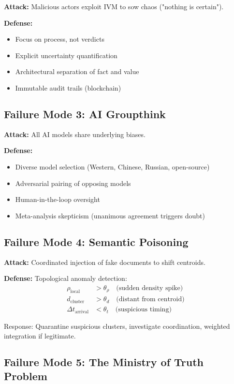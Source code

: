 \documentclass[11pt,a4paper]{article}
\theoremstyle{definition}
\theoremstyle{remark}
\begin{document}
\textbf{Attack:} Malicious actors exploit IVM to sow chaos ("nothing is certain").

\textbf{Defense:}
\begin{itemize}
\item Focus on process, not verdicts
\item Explicit uncertainty quantification
\item Architectural separation of fact and value
\item Immutable audit trails (blockchain)
\end{itemize}

\subsection{Failure Mode 3: AI Groupthink}

\textbf{Attack:} All AI models share underlying biases.

\textbf{Defense:}
\begin{itemize}
\item Diverse model selection (Western, Chinese, Russian, open-source)
\item Adversarial pairing of opposing models
\item Human-in-the-loop oversight
\item Meta-analysis skepticism (unanimous agreement triggers doubt)
\end{itemize}

\subsection{Failure Mode 4: Semantic Poisoning}

\textbf{Attack:} Coordinated injection of fake documents to shift centroids.

\textbf{Defense:} Topological anomaly detection:
\begin{align}
\rho_{\text{local}} &> \theta_{\rho} \quad \text{(sudden density spike)}\\
d_{\text{cluster}} &> \theta_d \quad \text{(distant from centroid)}\\
\Delta t_{\text{arrival}} &< \theta_t \quad \text{(suspicious timing)}
\end{align}

Response: Quarantine suspicious clusters, investigate coordination, weighted integration if legitimate.

\subsection{Failure Mode 5: The Ministry of Truth Problem}
\end{document}
